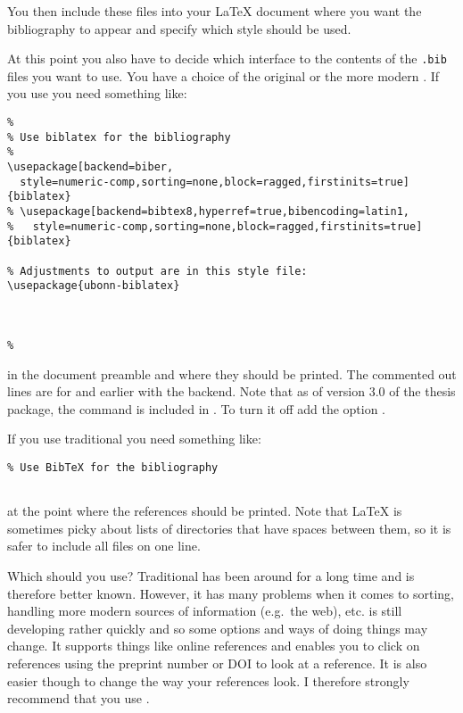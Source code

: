 You then include these files into your \LaTeX{} document where you
want the bibliography to appear and specify which style should be
used.

At this point you also have to decide which interface to the contents
of the \texttt{.bib} files you want to use. You have a choice of the
original \BibTeX{} or the more modern
. If you use  you
need something like:
\begin{verbatim}
%
% Use biblatex for the bibliography
%
\usepackage[backend=biber,
  style=numeric-comp,sorting=none,block=ragged,firstinits=true]{biblatex}
% \usepackage[backend=bibtex8,hyperref=true,bibencoding=latin1,
%   style=numeric-comp,sorting=none,block=ragged,firstinits=true]{biblatex}

% Adjustments to output are in this style file:
\usepackage{ubonn-biblatex}



% 
\end{verbatim}
in the document preamble and  where they
should be printed. The commented out lines are for  and earlier with
the  backend.
Note that as of version 3.0 of the thesis package,
the  command is included in .
To turn it off add the option .
\par\noindent
If you use traditional \BibTeX{} you need something like:
\begin{verbatim}
% Use BibTeX for the bibliography


\end{verbatim}
at the point where the references should be printed.
Note that \LaTeX{} is sometimes picky about lists of directories that
have spaces between them, so it is safer to include all files on one line.

Which should you use? Traditional \BibTeX{} has been around for a long time and is
therefore better known. However, it has many problems when it comes to
sorting, handling more modern sources of information (e.g.\ the web),
etc.  is still developing rather quickly and
so some options and ways of doing things may change. It supports
things like online references and enables you to click on references
using the preprint number or DOI to look at a reference. It is also
easier though to change the way your references look. I therefore
strongly recommend that you use .

